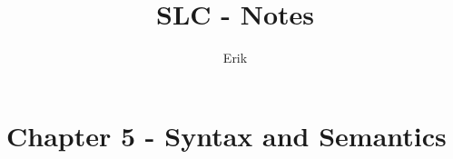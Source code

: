 \documentclass{article}
\title{SLC - Notes}
\author{Erik}
\begin{document}
\maketitle

\section{Chapter 5 - Syntax and
Semantics}
\end{document}
